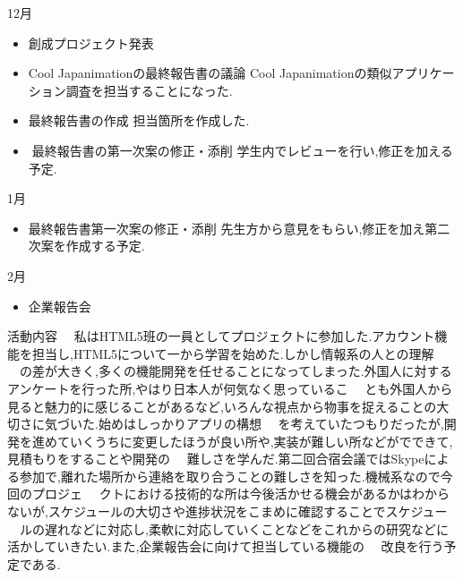 12月
\begin{itemize}
\item 創成プロジェクト発表
\item Cool Japanimationの最終報告書の議論
Cool Japanimationの類似アプリケーション調査を担当することになった.
\item 最終報告書の作成
担当箇所を作成した.
\item最終報告書の第一次案の修正・添削
学生内でレビューを行い,修正を加える予定.
\end{itemize}
1月
\begin{itemize}
\item 最終報告書第一次案の修正・添削
先生方から意見をもらい,修正を加え第二次案を作成する予定.
\end{itemize}
2月
\begin{itemize}
\item 企業報告会
\end{itemize}
\per
活動内容
　私はHTML5班の一員としてプロジェクトに参加した.アカウント機能を担当し,HTML5について一から学習を始めた.しかし情報系の人との理解
　の差が大きく,多くの機能開発を任せることになってしまった.外国人に対するアンケートを行った所,やはり日本人が何気なく思っているこ
　とも外国人から見ると魅力的に感じることがあるなど,いろんな視点から物事を捉えることの大切さに気づいた.始めはしっかりアプリの構想
　を考えていたつもりだったが,開発を進めていくうちに変更したほうが良い所や,実装が難しい所などがでできて,見積もりをすることや開発の
　難しさを学んだ.第二回合宿会議ではSkypeによる参加で,離れた場所から連絡を取り合うことの難しさを知った.機械系なので今回のプロジェ
　クトにおける技術的な所は今後活かせる機会があるかはわからないが,スケジュールの大切さや進捗状況をこまめに確認することでスケジュー
　ルの遅れなどに対応し,柔軟に対応していくことなどをこれからの研究などに活かしていきたい.また,企業報告会に向けて担当している機能の
　改良を行う予定である.
　

